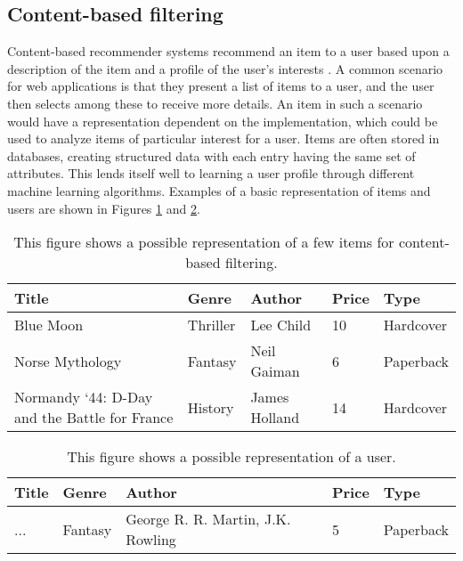 \subsection{Content-based filtering}\label{content-based-filtering}
Content-based recommender systems recommend an item to a user based upon a description of the item and a profile of the user's interests \cite{ContentBasedFiltering}.
A common scenario for web applications is that they present a list of items to a user, and the user then selects among these to receive more details. 
An item in such a scenario would have a representation dependent on the implementation, which could be used to analyze items of particular interest for a user.
Items are often stored in databases, creating structured data with each entry having the same set of attributes. 
This lends itself well to learning a user profile through different machine learning algorithms.
Examples of a basic representation of items and users are shown in Figures \ref{tbl:content-item} and \ref{tbl:content-user}.
\begin{table}[H]
    \centering
    \begin{tabular}{|l|l|l|l|l|}
    \hline
    Title                                         & Genre    & Author        & Price & Type      \\ \hline
    Blue Moon                                     & Thriller & Lee Child     & 10    & Hardcover \\ \hline
    Norse Mythology                               & Fantasy  & Neil Gaiman   & 6     & Paperback \\ \hline
    Normandy ‘44: D-Day and the Battle for France & History  & James Holland & 14    & Hardcover \\ \hline
    \end{tabular}
    \caption{This figure shows a possible representation of a few items for content-based filtering.}
    \label{tbl:content-item}
    \end{table}
\begin{table}[H]
    \centering
    \begin{tabular}{|l|l|l|l|l|}
    \hline
    Title                                         & Genre    & Author        & Price & Type      \\ \hline
    ... & Fantasy  & George R. R. Martin, J.K. Rowling & 5    & Paperback \\\hline
    \end{tabular}
    \caption{This figure shows a possible representation of a user.}
    \label{tbl:content-user}
\end{table}
